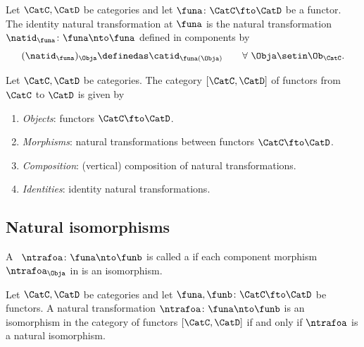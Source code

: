 \begin{ctdefinition}\label{def:identity-natural-transformation}
    Let $\CatC, \CatD$ be categories and let $\funa \colon \CatC \fto \CatD$ be a functor.
    The identity natural transformation at $\funa$ is the natural transformation $\natid_\funa \colon \funa \nto \funa$ defined in components by
    \begin{equation}\label{eq:identity-nat-trafo-def}
        (\natid_\funa)_\Obja \definedas \catid_{\funa(\Obja)} \quad \quad \forall \ \Obja \setin\Ob_\CatC.
    \end{equation}
\end{ctdefinition}

\begin{ctdefinition}\label{def:category-of-functors}
    Let $\CatC, \CatD$ be categories.
    The category $[\CatC, \CatD]$ of functors from $\CatC$ to $\CatD$ is given by
    \begin{enumerate}
        \item \emph{Objects}: functors $\CatC \fto \CatD$.
        \item \emph{Morphisms}: natural transformations between functors $\CatC \fto \CatD$.
        \item \emph{Composition}: (vertical) composition of natural transformations.
        \item \emph{Identities}: identity natural transformations.
    \end{enumerate}
\end{ctdefinition}

\subsection{Natural isomorphisms}

\begin{ctdefinition}
    \label{def:natural-isomorphism}
    A ~$\ntrafoa \colon \funa \nto \funb $ is called a  if each component morphism ~$\ntrafoa_\Obja$ in \CatD is an isomorphism.
\end{ctdefinition}

\begin{lemma}
    Let $\CatC, \CatD$ be categories and let $\funa, \funb \colon \CatC \fto \CatD$ be functors.
    A natural transformation $\ntrafoa \colon \funa \nto \funb $ is an isomorphism in the category of functors $[\CatC, \CatD]$ if and only if $\ntrafoa$ is a natural isomorphism.
\end{lemma}

